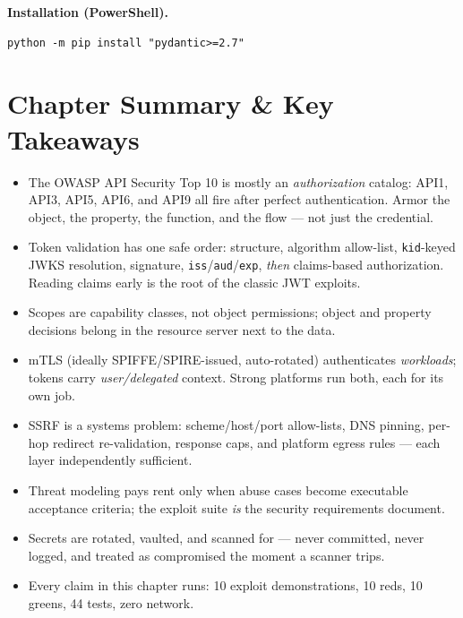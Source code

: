\textbf{Installation (PowerShell).}
\begin{verbatim}
python -m pip install "pydantic>=2.7"
\end{verbatim}

\section{Chapter Summary \& Key Takeaways}
\label{sec:ch16-summary}

\begin{itemize}[itemsep=0.3em]
  \item The OWASP API Security Top 10 is mostly an \emph{authorization}
        catalog: API1, API3, API5, API6, and API9 all fire after perfect
        authentication. Armor the object, the property, the function, and
        the flow --- not just the credential.
  \item Token validation has one safe order: structure, algorithm
        allow-list, \texttt{kid}-keyed JWKS resolution, signature,
        \texttt{iss}/\texttt{aud}/\texttt{exp}, \emph{then} claims-based
        authorization. Reading claims early is the root of the classic
        JWT exploits.
  \item Scopes are capability classes, not object permissions; object and
        property decisions belong in the resource server next to the data.
  \item mTLS (ideally SPIFFE/SPIRE-issued, auto-rotated) authenticates
        \emph{workloads}; tokens carry \emph{user/delegated} context.
        Strong platforms run both, each for its own job.
  \item SSRF is a systems problem: scheme/host/port allow-lists, DNS
        pinning, per-hop redirect re-validation, response caps, and
        platform egress rules --- each layer independently sufficient.
  \item Threat modeling pays rent only when abuse cases become executable
        acceptance criteria; the exploit suite \emph{is} the security
        requirements document.
  \item Secrets are rotated, vaulted, and scanned for --- never committed,
        never logged, and treated as compromised the moment a scanner
        trips.
  \item Every claim in this chapter runs: 10 exploit demonstrations,
        10 reds, 10 greens, 44 tests, zero network.
\end{itemize}

